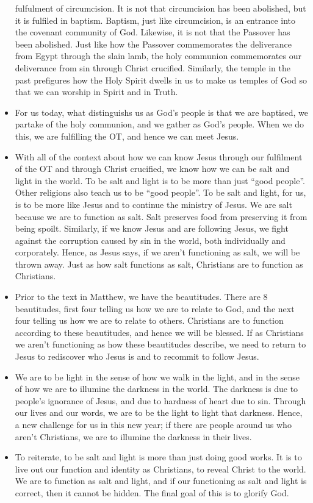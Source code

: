 \begin{itemize}
{  fulfulment of circumcision.  It is not that circumcision has been
  abolished, but it is fulfiled in baptism.  Baptism, just like circumcision,
  is an entrance into the covenant community of God.  Likewise, it is not
  that the Passover has been abolished.  Just like how the Passover
  commemorates the deliverance from Egypt through the slain lamb, the holy
  communion commemorates our deliverance from sin through Christ crucified.
  Similarly, the temple in the past prefigures how the Holy Spirit dwells in
  us to make us temples of God so that we can worship in Spirit and in
  Truth.}
  \item{For us today, what distinguishs us as God's people is that we are
  baptised, we partake of the holy communion, and we gather as God's people.
  When we do this, we are fulfilling the OT, and hence we can meet Jesus.}
  \item{With all of the context about how we can know Jesus through our
  fulfilment of the OT and through Christ crucified, we know how we can be
  salt and light in the world.  To be salt and light is to be more than just
  ``good people''.  Other religions also teach us to be ``good people''.  To
  be salt and light, for us, is to be more like Jesus and to continue the
  ministry of Jesus.  We are salt because we are to function as salt.  Salt
  preserves food from preserving it from being spoilt.  Similarly, if we know
  Jesus and are following Jesus, we fight against the corruption caused by
  sin in the world, both individually and corporately.  Hence, as Jesus says,
  if we aren't functioning as salt, we will be thrown away.  Just as how salt
  functions as salt, Christians are to function as Christians.}
  \item{Prior to the text in Matthew, we have the beautitudes.  There are 8
  beautitudes, first four telling us how we are to relate to God, and the
  next four telling us how we are to relate to others.  Christians are to
  function according to these beautitudes, and hence we will be blessed.  If
  as Christians we aren't functioning as how these beautitudes describe, we
  need to return to Jesus to rediscover who Jesus is and to recommit to
  follow Jesus.  }
  \item{We are to be light in the sense of how we walk in the light, and in
  the sense of how we are to illumine the darkness in the world.  The
  darkness is due to people's ignorance of Jesus, and due to hardness of
  heart due to sin.  Through our lives and our words, we are to be the light
  to light that darkness.  Hence, a new challenge for us in this new year; if
  there are people around us who aren't Christians, we are to illumine the
  darkness in their lives.}
  \item{To reiterate, to be salt and light is more than just doing good works. It is to live out our function and identity as Christians, to reveal Christ to the world. We are to function as salt and light, and if our functioning as salt and light is correct, then it cannot be hidden. The final goal of this is to glorify God. }
\end{itemize}